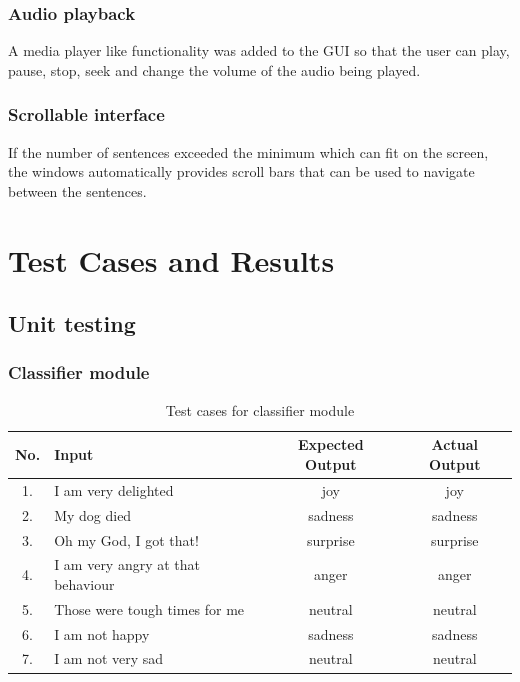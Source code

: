\documentclass[oneside,a4paper,12pt]{book}
\begin{document}
\begin{appendices}
\subsubsection{Audio playback}
A media player like functionality was added to the GUI so that the user can play, pause, stop, seek and change the volume of the audio being played. 
\subsubsection{Scrollable interface}
If the number of sentences exceeded the minimum which can fit on the screen, the windows automatically provides scroll bars that can be used to navigate between the sentences.
\newpage
\section{Test Cases and Results}
\subsection{Unit testing}
\subsubsection{Classifier module}   
\begin{table}[!htbp]
	\def\arraystretch{1.5}
	\begin{tabularx}{\textwidth}{|c|X|c|c|}
		\hline 
		No. & Input	& Expected Output & Actual Output \\ \hline
		1. & I am very delighted & joy & joy \\ \hline
		2. & My dog died & sadness & sadness \\ \hline
		3. & Oh my God, I got that! & surprise & surprise \\ \hline
		4. & I am very angry at that behaviour & anger & anger \\ \hline
		5. & Those were tough times for me & neutral & neutral \\ \hline
		6. & I am not happy & sadness & sadness \\ \hline
		7. & I am not very sad & neutral & neutral \\ \hline
	\end{tabularx}
	\caption{Test cases for classifier module}
	\label{tab:testcases}
\end{table}

\newpage

\end{appendices}
\end{document}
